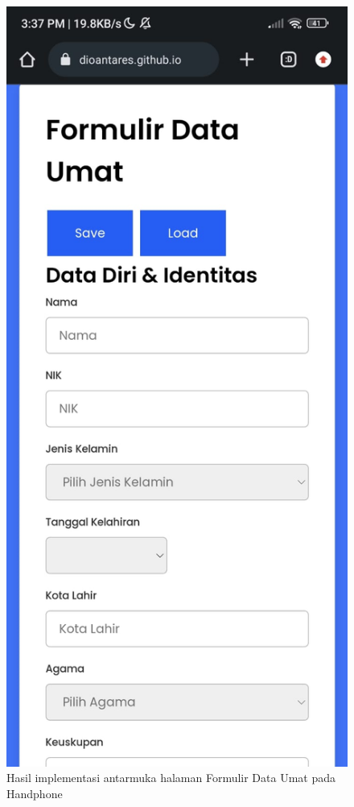 \begin{figure}[H]
	\centering
	\includegraphics[scale=0.3]{Gambar/websiteHP.jpg}
	\caption{Hasil implementasi antarmuka halaman Formulir Data Umat pada Handphone} 
	\label{fig:websiteHP}
\end{figure}

